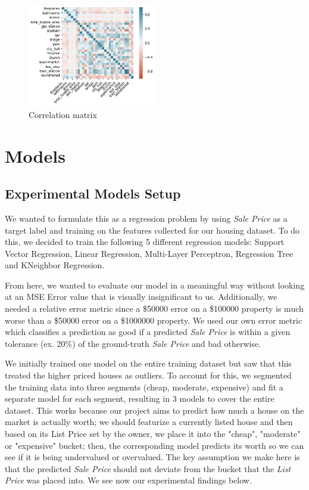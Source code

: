 \documentclass[11pt,a4paper]{article}
\begin{document}
\begin{figure}[h]
\centering
\includegraphics[width=0.5\textwidth]{result-data/correlation_matrix}
\caption{Correlation matrix}
\label{fig:corr}
\end{figure}


\section{Models}

\subsection{Experimental Models Setup}

We wanted to formulate this as a regression problem by using \textit{Sale Price} as a target label and training on the features collected for our housing dataset. To do this, we decided to train the following 5 different regression models: Support Vector Regression, Linear Regression, Multi-Layer Perceptron, Regression Tree and KNeighbor Regression.

\medskip

From here, we wanted to evaluate our model in a meaningful way without looking at an MSE Error value that is visually insignificant to us. Additionally, we needed a relative error metric since a \$50000 error on a \$100000 property is much worse than a \$50000 error on a \$1000000 property. We used our own error metric which classifies a prediction as good if a predicted \textit{Sale Price} is within a given tolerance (ex. 20\%) of the ground-truth \textit{Sale Price} and bad otherwise. 

\medskip

We initially trained one model on the entire training dataset but saw that this treated the higher priced houses as outliers. To account for this, we segmented the training data into three segments (cheap, moderate, expensive) and fit a separate model for each segment, resulting in 3 models to cover the entire dataset. This works because our project aims to predict how much a house on the market is actually worth; we should featurize a currently listed house and then based on its List Price set by the owner, we place it into the "cheap", "moderate" or "expensive" bucket; then, the corresponding model predicts its worth so we can see if it is being undervalued or overvalued. The key assumption we make here is that the predicted \textit{Sale Price} should not deviate from the bucket that the \textit{List Price} was placed into. 
We see now our experimental findings below.
\end{document}
